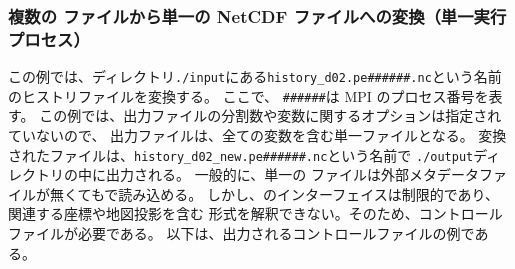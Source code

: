 \subsubsection{複数の \scalenetcdf ファイルから単一の NetCDF ファイルへの変換（単一実行プロセス）}
%
%
この例では、ディレクトリ\verb|./input|にある\verb|history_d02.pe######.nc|という名前のヒストリファイルを変換する。
ここで、 \verb|######|は MPI のプロセス番号を表す。
この例では、出力ファイルの分割数や変数に関するオプションは指定されていないので、
出力ファイルは、全ての変数を含む単一ファイルとなる。
変換されたファイルは、\verb|history_d02_new.pe######.nc|という名前で \verb|./output|ディレクトリの中に出力される。
%
一般的に、単一の \netcdf ファイルは外部メタデータファイルが無くても{\grads}で読み込める。
しかし、\grads のインターフェイスは制限的であり、関連する座標や地図投影を含む \scalenetcdf 形式を解釈できない。そのため、コントロールファイルが必要である。
以下は、出力されるコントロールファイルの例である。
%
